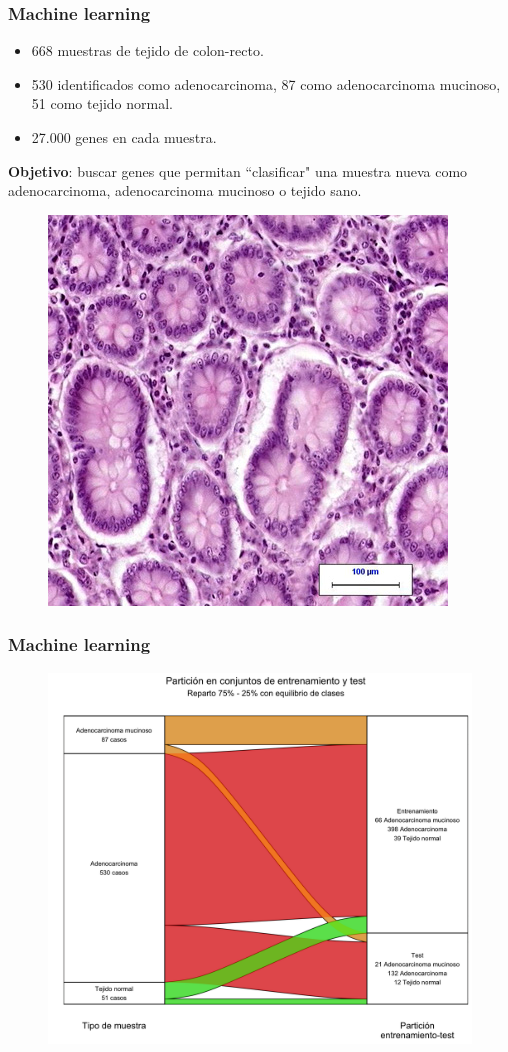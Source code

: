 \documentclass{beamer}
\begin{document}
\begin{frame}\frametitle{Machine learning}
	\begin{itemize}
		\item 668 muestras de tejido de colon-recto.
		\item 530 identificados como adenocarcinoma, 87 como adenocarcinoma mucinoso, 51 como tejido normal.
		\item 27.000 genes en cada muestra.
	\end{itemize}
	\textbf{Objetivo}: buscar genes que permitan ``clasificar" una muestra nueva como adenocarcinoma, adenocarcinoma mucinoso o tejido sano.
	\begin{figure}
		\centering
		\includegraphics[width=.4\textwidth]{images/cr.png}
	\end{figure}
\end{frame}


\begin{frame}\frametitle{Machine learning}
	\begin{figure}
		\centering
		\includegraphics[width=.75\textwidth]{images/35_cr_multiclase_05_sankey.png}
	\end{figure}
\end{frame}
\end{document}

